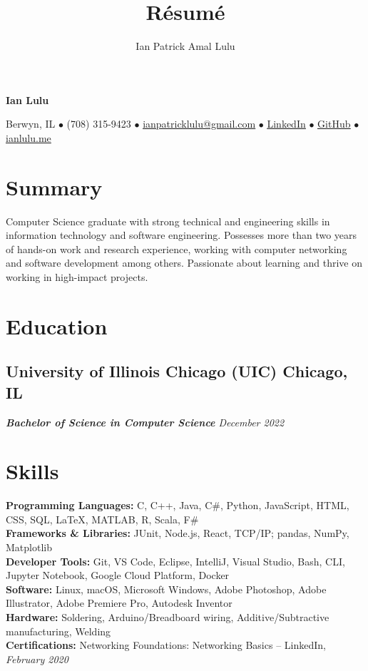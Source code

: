 \documentclass{article}
\makeatletter
\renewcommand{\maketitle}{
    \begin{center}
    {\bfseries\huge
    Ian Lulu}
    
    \vspace{0.25em}

    Berwyn, IL {$\bullet$} (708) 315-9423 {$\bullet$} \href{mailto:ianpatricklulu@gmail.com}{\underline{ianpatricklulu@gmail.com}} {$\bullet$} \href{https://www.linkedin.com/in/ianlulu/}{\underline{LinkedIn}} {$\bullet$} \href{https://github.com/IanLulu}{\underline{GitHub}} {$\bullet$} \url{ianlulu.me}
    
    \end{center}
}
\makeatother
\begin{document}
\title{R\'esum\'e}
\author{Ian Patrick Amal Lulu}


\maketitle
{} %


\section{Summary}
Computer Science graduate with strong technical and engineering skills in information technology and software engineering.
Possesses more than two years of hands-on work and research experience, working with computer networking and software development among others.
Passionate about learning and thrive on working in high-impact projects.


\section{Education}
\subsection{University of Illinois Chicago (UIC) \hfill \textnormal{Chicago, IL}}
\vspace{-0.5em}
\textit{\textbf{Bachelor of Science in Computer Science} \hfill December 2022}


\section{Skills}
\textbf{Programming Languages:} C, C++, Java, C\#, Python, JavaScript, HTML, CSS, SQL, {\LaTeX}, MATLAB, R, Scala, F\#
\\
\textbf{Frameworks \& Libraries:} JUnit, Node.js, React, TCP/IP; pandas, NumPy, Matplotlib
\\
\textbf{Developer Tools:} Git, VS Code, Eclipse, IntelliJ, Visual Studio, Bash, CLI, Jupyter Notebook, Google Cloud Platform, Docker
\\
\textbf{Software:} Linux, macOS, Microsoft Windows, Adobe Photoshop, Adobe Illustrator, Adobe Premiere Pro, Autodesk Inventor
\\
\textbf{Hardware:} Soldering, Arduino/Breadboard wiring, Additive/Subtractive manufacturing, Welding
\\
\textbf{Certifications:} Networking Foundations: Networking Basics -- LinkedIn, \textit{February 2020}
\end{document}
